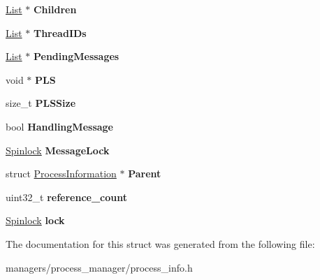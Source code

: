 \begin{DoxyCompactItemize}
\item 
\hyperlink{structList}{List} $\ast$ {\bfseries Children}\hypertarget{structProcessInformation_a94efc6279b09448452a0924a3d5f020b}{}\label{structProcessInformation_a94efc6279b09448452a0924a3d5f020b}

\item 
\hyperlink{structList}{List} $\ast$ {\bfseries Thread\+I\+Ds}\hypertarget{structProcessInformation_a48615b491b5f02a51843631be1d658ff}{}\label{structProcessInformation_a48615b491b5f02a51843631be1d658ff}

\item 
\hyperlink{structList}{List} $\ast$ {\bfseries Pending\+Messages}\hypertarget{structProcessInformation_a2b2e3a595afce3ee471eb547a97eb515}{}\label{structProcessInformation_a2b2e3a595afce3ee471eb547a97eb515}

\item 
void $\ast$ {\bfseries P\+LS}\hypertarget{structProcessInformation_aea71507af16eceea24997d48a636eca5}{}\label{structProcessInformation_aea71507af16eceea24997d48a636eca5}

\item 
size\+\_\+t {\bfseries P\+L\+S\+Size}\hypertarget{structProcessInformation_a3d292b5b489080408927126c5be13025}{}\label{structProcessInformation_a3d292b5b489080408927126c5be13025}

\item 
bool {\bfseries Handling\+Message}\hypertarget{structProcessInformation_a6a0dfc7e679df7ecfc7576cd0cc078fe}{}\label{structProcessInformation_a6a0dfc7e679df7ecfc7576cd0cc078fe}

\item 
\hyperlink{group__sync__hal_ga2b7bd1f01b65ccbfaee98f004746ae8b}{Spinlock} {\bfseries Message\+Lock}\hypertarget{structProcessInformation_a792997a09df97d1783c7ae3ec0b51bbc}{}\label{structProcessInformation_a792997a09df97d1783c7ae3ec0b51bbc}

\item 
struct \hyperlink{structProcessInformation}{Process\+Information} $\ast$ {\bfseries Parent}\hypertarget{structProcessInformation_ab528f43e4fa476d831c0272e0866674f}{}\label{structProcessInformation_ab528f43e4fa476d831c0272e0866674f}

\item 
uint32\+\_\+t {\bfseries reference\+\_\+count}\hypertarget{structProcessInformation_ad755feb5f3610757e98a7f1f9d8acc99}{}\label{structProcessInformation_ad755feb5f3610757e98a7f1f9d8acc99}

\item 
\hyperlink{group__sync__hal_ga2b7bd1f01b65ccbfaee98f004746ae8b}{Spinlock} {\bfseries lock}\hypertarget{structProcessInformation_a876a352e5328aea15bf4948c86edae8b}{}\label{structProcessInformation_a876a352e5328aea15bf4948c86edae8b}

\end{DoxyCompactItemize}


The documentation for this struct was generated from the following file\+:\begin{DoxyCompactItemize}
\item 
managers/process\+\_\+manager/process\+\_\+info.\+h\end{DoxyCompactItemize}

